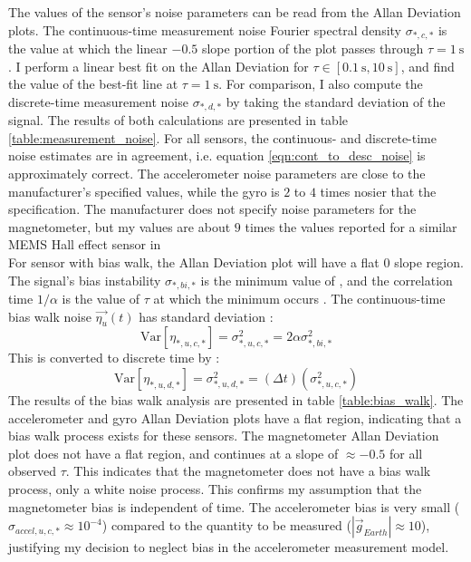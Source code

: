 \documentclass[conference]{IEEEtran}
\newcommand{\Var}{\mathrm{Var}}
\begin{document}
The values of the sensor's noise parameters can be read from the Allan Deviation plots. The continuous-time measurement noise Fourier spectral density $\sigma_{*,c,*}$ is the value at which the linear $-0.5$ slope portion of the plot passes through $\tau = \SI{1}{\second}$ \cite{UCAM-CL-TR-696}. I perform a linear best fit on the Allan Deviation for $\tau \in [\SI{0.1}{\second}, \SI{10}{\second}]$, and find the value of the best-fit line at $\tau = \SI{1}{\second}$. For comparison, I also compute the discrete-time measurement noise $\sigma_{*,d,*}$ by taking the standard deviation of the signal. The results of both calculations are presented in table \ref{table:measurement_noise}. For all sensors, the continuous- and discrete-time noise estimates are in agreement, i.e. equation \ref{eqn:cont_to_desc_noise} is approximately correct. The accelerometer noise parameters are close to the manufacturer's specified values, while the gyro is $2$ to $4$ times nosier that the specification. The manufacturer does not specify noise parameters for the magnetometer, but my values are about $9$ times the values reported for a similar MEMS Hall effect sensor in \cite{1643403}\\

For sensor with bias walk, the Allan Deviation plot will have a flat $0$ slope region. The signal's bias instability $\sigma_{*,bi,*}$ is the minimum value of , and the correlation time $1/\alpha$ is the value of $\tau$ at which the minimum occurs \cite{UCAM-CL-TR-696}. The continuous-time bias walk noise $\vec{\eta_u}(t)$ has standard deviation \cite{1642588}:
\begin{equation}
    \Var[\eta_{*,u,c,*}] = \sigma_{*,u,c,*}^2 = 2 \alpha \sigma_{*,bi,*}^2
\end{equation}
This is converted to discrete time by \cite{1642588}:
\begin{equation}
    \Var[\eta_{*,u,d,*}] = \sigma_{*,u,d,*}^2 = (\Delta t) (\sigma_{*,u,c,*}^2)
\end{equation}
The results of the bias walk analysis are presented in table \ref{table:bias_walk}. The accelerometer and gyro Allan Deviation plots have a flat region, indicating that a bias walk process exists for these sensors. The magnetometer Allan Deviation plot does not have a flat region, and continues at a slope of $\approx -0.5$ for all observed $\tau$. This indicates that the magnetometer does not have a bias walk process, only a white noise process. This confirms my assumption that the magnetometer bias is independent of time. The accelerometer bias is very small ($\sigma_{accel,u,c,*} \approx 10^{-4}$) compared to the quantity to be measured ($|\vec{g}_{Earth}| \approx 10$), justifying my decision to neglect bias in the accelerometer measurement model.
\end{document}
